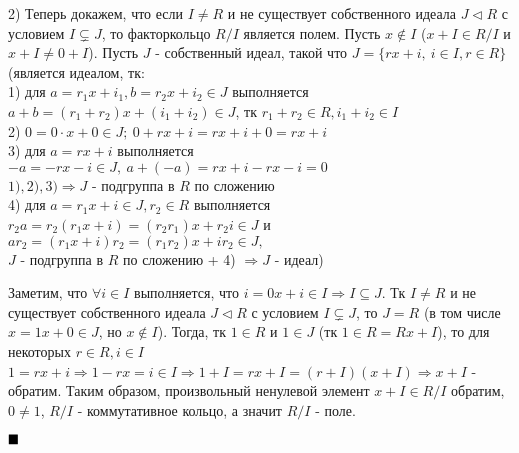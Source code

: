 \documentclass[a4paper, 16pt]{article}
\newenvironment{proof}[1][Доказательство]{%
	\begin{trivlist}
		\item[\hskip \labelsep {\bfseries #1:}]
		\item \hspace{14pt}
	}{
		$ \hfill\blacksquare $
	\end{trivlist}
	\hfill\break
}
\begin{document}
\begin{proof}
			2) Теперь докажем, что если $I \ne R$ и не существует собственного идеала $J \lhd R$ с условием $I \subsetneq J$, то факторкольцо $R / I$ является полем. Пусть $x \notin I$ ($x + I \in R / I$ и $x + I \ne 0 + I$). Пусть $J$ - собственный идеал, такой что $J = \{rx + i, \ i \in I, r \in R\}$ (является идеалом, тк: \\
			1) для $a = r_1x+i_1, b = r_2x+i_2 \in J$ выполняется $ a + b = (r_1 + r_2)x + (i_1 + i_2) \in J$, тк $r_1 + r_2 \in R, i_1+i_2 \in I$ \\
			2) $0 = 0 \cdot x + 0 \in J; \ 0 + rx + i = rx + i + 0 = rx + i$ \\
			3) для $a = rx + i$ выполняется $-a = -rx - i \in J, \ a + (-a) = rx + i - rx - i = 0$ \\
			$1), 2), 3) \Rightarrow J$ - подгруппа в $R$ по сложению \\
			4) для $a = r_1x + i \in J, r_2 \in R$ выполняется $ r_2a=r_2 (r_1x + i) = (r_2r_1)x + r_2i \in J$ и $ ar_2 = (r_1x + i) r_2 = (r_1r_2)x + ir_2 \in J,$ \\
			$J$ - подгруппа в $R$ по сложению + 4) $\Rightarrow J$ - идеал) 
			
			Заметим, что $\forall i \in I$ выполняется, что $i = 0x + i \in I \Rightarrow I \subseteq J$. Тк $I \ne R$ и не существует собственного идеала $J \lhd R$ с условием $I \subsetneq J$, то $J = R$ (в том числе $x = 1x + 0 \in J$, но $x \notin I$). Тогда, тк $1 \in R$ и $1 \in J$ (тк $1 \in R = Rx + I$), то  для некоторых $r \in R, i \in I$ $1 = rx + i \Rightarrow 1 - rx = i \in I \Rightarrow 1 + I = rx + I = (r + I)(x + I) \Rightarrow x + I$ - обратим. Таким образом, произвольный ненулевой элемент $x + I \in R/I$ обратим, $0 \ne 1$, $R/I$ - коммутативное кольцо, а значит $R/I$ - поле. 
		\end{proof}
	
	
	
	
	
\end{document}
